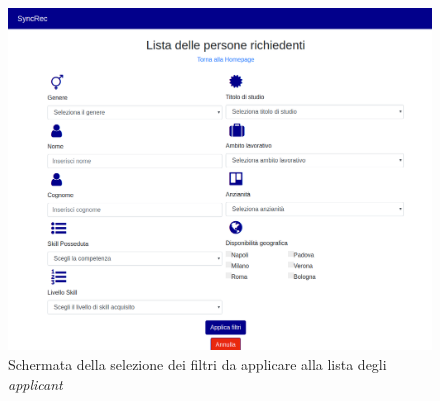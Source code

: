 \vspace{0.5em}
\begin{figure}[!h] 
	\centering 
	\includegraphics[width=1\columnwidth]{immagini/svil/filtri} 
	\caption{Schermata della selezione dei filtri da applicare alla lista degli \textit{applicant}}
	\label{figura:filtri}
\end{figure}

